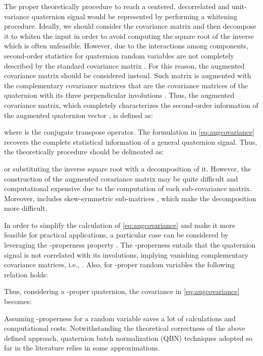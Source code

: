 \documentclass[graybox]{svmult}
\begin{document}
The proper theoretically procedure to reach a centered, decorrelated and unit-variance quaternion signal would be represented by performing a whitening procedure. Ideally, we should consider the covariance matrix and then decompose it to whiten the input in order to avoid computing the square root of the inverse which is often unfeasible. However, due to the interactions among components, second-order statistics for quaternion random variables are not completely described by the standard covariance matrix \cite{TookSIGPRO2011}. For this reason, the augmented covariance matrix should be considered instead. Such matrix is augmented with the complementary covariance matrices  that are the covariance matrices of the quaternion with its three perpendicular involutions . Thus, the augmented covariance matrix, which completely characterizes the second-order information of the augmented quaternion vector , is defined as:



\noindent where  is the conjugate transpose operator. The formulation in \eqref{eq:augcovariance} recovers the complete statistical information of a general quaternion signal. Thus, the theoretically procedure should be delineated as:



\noindent or substituting the inverse square root  with a decomposition of it. However, the construction of the augmented covariance matrix may be quite difficult and computational expensive due to the computation of each sub-covariance matrix. Moreover,  includes skew-symmetric sub-matrices \cite{TookSIGPRO2011}, which make the decomposition more difficult.

In order to simplify the calculation of \eqref{eq:augcovariance} and make it more feasible for practical applications, a particular case can be considered by leveraging the -properness property \cite{ViaTIT2010, TookSIGPRO2011, GrassucciICASSP2021}. The -properness entails that the quaternion signal is not correlated with its involutions, implying vanishing complementary covariance matrices, i.e., . Also, for -proper random variables the following relation holds:



\noindent Thus, considering a -proper quaternion, the covariance in \eqref{eq:augcovariance} becomes:



Assuming -properness for a random variable  saves a lot of calculations and computational costs. Notwithstanding the theoretical correctness of the above defined approach, quaternion batch normalization (QBN) techniques adopted so far in the literature relies in some approximations.
\end{document}
